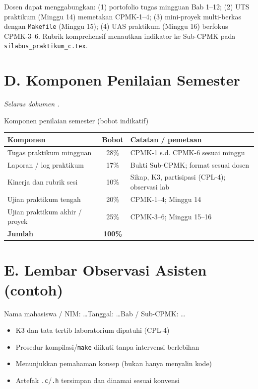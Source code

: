 Dosen dapat menggabungkan: (1) portofolio tugas mingguan Bab 1--12; (2) UTS praktikum (Minggu 14) memetakan CPMK-1--4; (3) mini-proyek multi-berkas dengan \texttt{Makefile} (Minggu 15); (4) UAS praktikum (Minggu 16) berfokus CPMK-3--6. Rubrik komprehensif menautkan indikator ke Sub-CPMK pada \texttt{silabus\_praktikum\_c.tex}.

\section*{D. Komponen Penilaian Semester}
\noindent\textit{Selaras dokumen .}
\vspace{0.35em}

\begin{modultable}[]{Komponen penilaian semester (bobot indikatif)}
\begin{tabular}{|l|c|>{\raggedright\arraybackslash}p{7.2cm}|}
\hline
\textbf{Komponen} & \textbf{Bobot} & \textbf{Catatan / pemetaan} \\
\hline
Tugas praktikum mingguan & 28\% & CPMK-1 s.d. CPMK-6 sesuai minggu \\
\hline
Laporan / log praktikum & 17\% & Bukti Sub-CPMK; format sesuai dosen \\
\hline
Kinerja dan rubrik sesi & 10\% & Sikap, K3, partisipasi (CPL-4); observasi lab \\
\hline
Ujian praktikum tengah & 20\% & CPMK-1--4; Minggu 14 \\
\hline
Ujian praktikum akhir / proyek & 25\% & CPMK-3--6; Minggu 15--16 \\
\hline
\textbf{Jumlah} & \textbf{100\%} & \\
\hline
\end{tabular}
\end{modultable}

\section*{E. Lembar Observasi Asisten (contoh)}

Nama mahasiswa / NIM: \ldots\quad Tanggal: \ldots\quad Bab / Sub-CPMK: \ldots

\begin{itemize}[leftmargin=*, label=$\square$]
  \item K3 dan tata tertib laboratorium dipatuhi (CPL-4)
  \item Prosedur kompilasi/\texttt{make} diikuti tanpa intervensi berlebihan
  \item Menunjukkan pemahaman konsep (bukan hanya menyalin kode)
  \item Artefak \texttt{.c}/\texttt{.h} tersimpan dan dinamai sesuai konvensi
\end{itemize}

